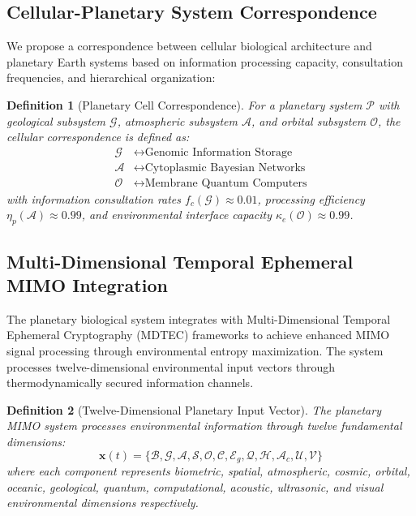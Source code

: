 \documentclass[12pt,a4paper]{article}
\newtheorem{definition}{Definition}
\begin{document}
\subsection{Cellular-Planetary System Correspondence}

We propose a correspondence between cellular biological architecture and planetary Earth systems based on information processing capacity, consultation frequencies, and hierarchical organization:

\begin{definition}[Planetary Cell Correspondence]
For a planetary system $\mathcal{P}$ with geological subsystem $\mathcal{G}$, atmospheric subsystem $\mathcal{A}$, and orbital subsystem $\mathcal{O}$, the cellular correspondence is defined as:
\begin{align}
\mathcal{G} &\leftrightarrow \text{Genomic Information Storage} \\
\mathcal{A} &\leftrightarrow \text{Cytoplasmic Bayesian Networks} \\
\mathcal{O} &\leftrightarrow \text{Membrane Quantum Computers}
\end{align}
with information consultation rates $f_c(\mathcal{G}) \approx 0.01$, processing efficiency $\eta_p(\mathcal{A}) \approx 0.99$, and environmental interface capacity $\kappa_e(\mathcal{O}) \approx 0.99$.
\end{definition}

\subsection{Multi-Dimensional Temporal Ephemeral MIMO Integration}

The planetary biological system integrates with Multi-Dimensional Temporal Ephemeral Cryptography (MDTEC) frameworks \citep{sachikonye2024mzekezeke} to achieve enhanced MIMO signal processing through environmental entropy maximization. The system processes twelve-dimensional environmental input vectors through thermodynamically secured information channels.

\begin{definition}[Twelve-Dimensional Planetary Input Vector]
The planetary MIMO system processes environmental information through twelve fundamental dimensions:
\begin{equation}
\mathbf{x}(t) = \{\mathcal{B}, \mathcal{G}, \mathcal{A}, \mathcal{S}, \mathcal{O}, \mathcal{C}, \mathcal{E}_g, \mathcal{Q}, \mathcal{H}, \mathcal{A}_c, \mathcal{U}, \mathcal{V}\}
\end{equation}
where each component represents biometric, spatial, atmospheric, cosmic, orbital, oceanic, geological, quantum, computational, acoustic, ultrasonic, and visual environmental dimensions respectively.
\end{definition}
\end{document}
